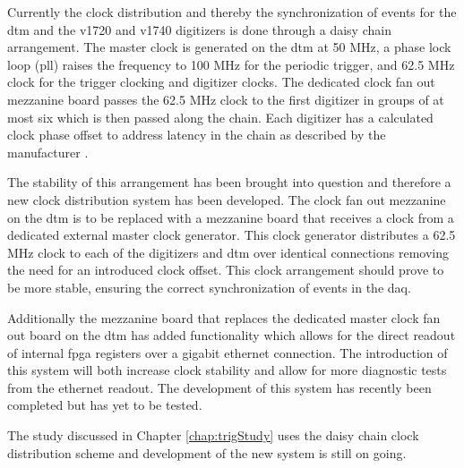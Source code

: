 Currently the clock distribution and thereby the synchronization of events for the \gls{dtm} and the \gls{v1720} and \gls{v1740} digitizers is done through a daisy chain arrangement. The master clock is generated on the \gls{dtm} at 50 MHz, a phase lock loop (\gls{pll}) raises the frequency to 100 MHz for the periodic trigger, and 62.5 MHz clock for the trigger clocking and digitizer clocks. The dedicated clock fan out mezzanine board passes the 62.5 MHz clock to the first digitizer in groups of at most six which is then passed along the chain. Each digitizer has a calculated clock phase offset to address latency in the chain as described by the manufacturer \cite{caenManual}.

The stability of this arrangement has been brought into question and therefore a new clock distribution system has been developed. The clock fan out mezzanine on the \gls{dtm} is to be replaced with a mezzanine board that receives a clock from a dedicated external master clock generator. This clock generator distributes a 62.5 MHz clock to each of the digitizers and \gls{dtm} over identical connections removing the need for an introduced clock offset. This clock arrangement should prove to be more stable, ensuring the correct synchronization of events in the \gls{daq}.

Additionally the mezzanine board that replaces the dedicated master clock fan out board on the \gls{dtm} has added functionality which allows for the direct readout of internal \gls{fpga} registers over a gigabit ethernet connection. The introduction of this system will both increase clock stability and allow for more diagnostic tests from the ethernet readout. The development of this system has recently been completed but has yet to be tested.

The study discussed in Chapter \ref{chap:trigStudy} uses the daisy chain clock distribution scheme and development of the new system is still on going.